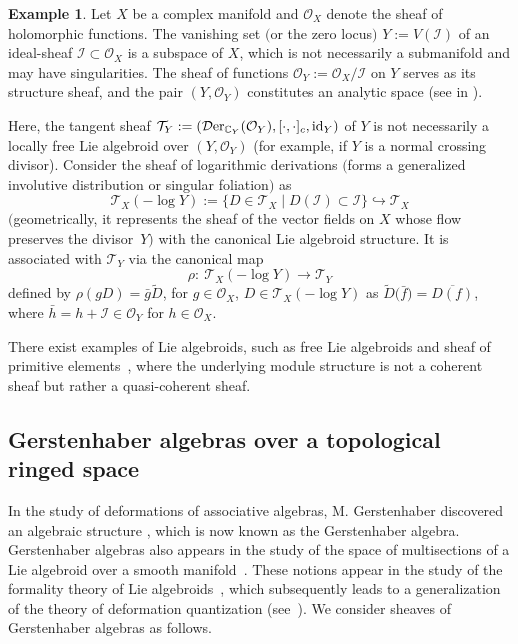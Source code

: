 \documentclass[pdftex]{sigma}
\numberwithin{equation}{section}
\theoremstyle{definition}
\newtheorem{Exm}[Thm]{Example}
\begin{document}
\begin{Exm}
	\label{analytic spaces}
	Let $X$ be a complex manifold and $\mathcal{O}_X$ denote the sheaf of holomorphic functions. The vanishing set $($or the zero locus$)$ $Y:= V(\mathcal{I})$ of an ideal-sheaf $\mathcal{I} \subset \mathcal{O}_X$ is a subspace of $X$, which is not necessarily a submanifold and may have singularities. The sheaf of functions $\mathcal{O}_Y := \mathcal{O}_X/{\mathcal{I}}$ on $Y$ serves as its structure sheaf, and the pair $(Y, \mathcal{O}_Y)$ constitutes an analytic space (see in \cite{BP}).
	
Here, the tangent sheaf $\mathcal{T}_Y := (\mathcal{D}{\rm er}_{\mathbb{C}_Y}(\mathcal{O}_Y), [\cdot,\cdot]_c, {\rm id}_Y)$ of $Y$ is not necessarily a locally free Lie algebroid over $(Y, \mathcal{O}_Y)$ (for example, if $Y$ is a normal crossing divisor). Consider the sheaf of logarithmic derivations $($forms a generalized involutive distribution or singular foliation$)$ \cite{AA, BP} as
\[
\mathcal{T}_X(-\log Y) := \{D \in \mathcal{T}_X \mid D(\mathcal{I}) \subset \mathcal{I}\} \hookrightarrow \mathcal{T}_X
\]
$($geometrically, it represents the sheaf of the vector fields on $X$ whose flow preserves the divisor~$Y)$ with the canonical Lie algebroid structure. It is associated with $\mathcal{T}_Y$ via the canonical map
\[
 \rho \colon \ \mathcal{T}_X(-\log Y) \rightarrow \mathcal{T}_Y
\]
	defined by $\rho (g D) = \bar{g} \tilde{D}$, for $g \in \mathcal{O}_X$, $D \in\mathcal{T}_X(-\log Y)$ as $\tilde{D}\bigl(\bar{f}\bigr) = \overline{D(f)}$, where $\bar{h}=h + \mathcal{I} \in \mathcal{O}_Y$ for $h \in \mathcal{O}_X$.
\end{Exm}

There exist examples of Lie algebroids, such as free Lie algebroids \cite{MK} and sheaf of primitive elements~\cite{AA}, where the underlying module structure is not a coherent sheaf but rather a quasi-coherent sheaf.

\subsection{Gerstenhaber algebras over a topological ringed space} \label{sheaves of G-algs}

In the study of deformations of associative algebras, M. Gerstenhaber discovered an algebraic structure \cite{MGer, MG-SS}, which is now known as the Gerstenhaber algebra. Gerstenhaber algebras also appears in the study of the space of multisections of a Lie algebroid over a smooth mani\-fold~\mbox{\cite{CV, PX}}. These notions appear in the study of the formality theory of Lie algebroids~\cite{DC}, which subsequently leads to a generalization of the theory of deformation quantization (see~\cite{TS}). We consider sheaves of Gerstenhaber algebras as follows.
\end{document}
